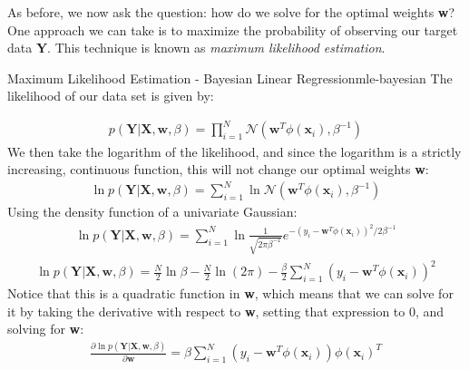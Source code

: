 
As before, we now ask the question: how do we solve for the optimal weights \textbf{w}? One approach we can take is to maximize the probability of observing our target data \textbf{Y}. This technique is known as \textit{maximum likelihood estimation}.

\begin{derivation}{Maximum Likelihood Estimation - Bayesian Linear Regression}{mle-bayesian}
    The likelihood of our data set is given by:

    \begin{align*}
        p(\textbf{Y} | \textbf{X}, \textbf{w}, \beta) = \prod_{i=1}^{N} \mathcal{N}(\textbf{w}^{T}\phi(\textbf{x}_{i}), \beta^{-1})
    \end{align*}
    We then take the logarithm of the likelihood, and since the logarithm is a strictly increasing, continuous function, this will not change our optimal weights \textbf{w}:
    \begin{align*}
        \ln{p(\textbf{Y} | \textbf{X}, \textbf{w}, \beta)} = \sum_{i=1}^{N} \ln{\mathcal{N}(\textbf{w}^{T}\phi(\textbf{x}_{i}), \beta^{-1})}
    \end{align*}
    Using the density function of a univariate Gaussian:
    \begin{align*}
        \ln{p(\textbf{Y} | \textbf{X}, \textbf{w}, \beta)} = \sum_{i=1}^{N} \ln{\frac{1}{\sqrt{2\pi\beta^{-1}}} e^{-(y_{i} - \textbf{w}^{T}\phi(\textbf{x}_{i}))^2 / 2\beta^{-1}}}
    \end{align*}
    \begin{align*}
        \ln{p(\textbf{Y} | \textbf{X}, \textbf{w}, \beta)} = \frac{N}{2}\ln{\beta} - \frac{N}{2}\ln{(2\pi)} - \frac{\beta}{2} \sum_{i=1}^{N} (y_{i} - \textbf{w}^{T}\phi(\textbf{x}_{i}))^2
    \end{align*}
    Notice that this is a quadratic function in \textbf{w}, which means that we can solve for it by taking the derivative with respect to \textbf{w}, setting that expression to 0, and solving for \textbf{w}:
    \begin{align*}
        \frac{\partial \ln{p(\textbf{Y} | \textbf{X}, \textbf{w}, \beta)}}{\partial \textbf{w}} = \beta \sum_{i=1}^{N} (y_{i} - \textbf{w}^{T}\phi(\textbf{x}_{i}))\phi(\textbf{x}_{i})^{T}
    \end{align*}

\end{derivation}
